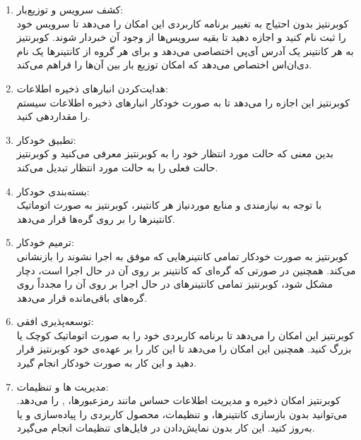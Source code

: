 \begin{enumerate}
	\item 
	کشف سرویس و توزیع‌بار:\\
	کوبرنتیز بدون احتیاج به تغییر برنامه کاربردی این امکان را می‌دهد تا سرویس خود را ثبت نام کنید و اجازه دهید تا بقیه سرویس‌ها از وجود آن خبردار شوند. کوبرنتیز به هر کانتینر یک آدرس آی‌پی اختصاصی می‌دهد و برای هر گروه از کانتینرها یک نام دی‌ان‌اس اختصاص می‌دهد که امکان توزیع بار بین آن‌ها را فراهم می‌کند.
	\item 
	هدایت‌کردن انبارهای ذخیره اطلاعات:\\
	کوبرنتیز این اجازه را می‌دهد تا به صورت خودکار انبارهای ذخیره اطلاعات سیستم را مقداردهی کنید.
	\item 
	تطبیق خودکار:\\
	بدین معنی که حالت مورد انتظار خود را به کوبرنتیز معرفی می‌کنید و کوبرنتیز حالت فعلی را به حالت مورد انتظار تبدیل می‌کند.
	
	\item
	بسته‌بندی خودکار:\\
	با توجه به نیازمندی و منابع مورد‌نیاز هر کانتینر، کوبرنتیز به صورت اتوماتیک کانتینرها را بر روی گره‌ها قرار می‌دهد.
	\item
	ترمیم خودکار:\\
	کوبرنتیز به صورت خودکار تمامی کانتینرهایی که موفق به اجرا نشوند را بازنشانی می‌کند. همچنین در صورتی که گره‌ای که کانتینر بر روی آن در حال اجرا است، دچار مشکل شود، کوبرنتیز تمامی کانتینرهای در حال اجرا بر روی آن را مجدداً روی گره‌های باقی‌مانده قرار می‌دهد.
	\item
	توسعه‌پذیری افقی:\\
	کوبرنتیز این امکان را می‌دهد تا برنامه کاربردی خود را به صورت اتوماتیک کوچک یا بزرگ کنید. همچنین این امکان را می‌دهد تا این کار را بر عهده‌ی خود کوبرنتیز قرار دهید و این کار به صورت خودکار انجام گیرد.
	
	\item
	مدیریت 
	ها و تنظیمات:\\
	کوبرنتیز امکان ذخیره و مدیریت اطلاعات حساس مانند رمز‌عبورها، 
	, 
	را می‌دهد. می‌توانید بدون بازسازی کانتینرها، 
	و تنظیمات، محصول کاربردی را پیاده‌سازی و یا به‌روز کنید. این کار بدون نمایش‌دادن 
	در فایل‌های تنظیمات انجام می‌گیرد.
	
\end{enumerate}

